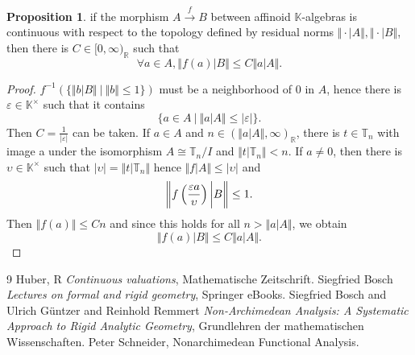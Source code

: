 \documentclass[10pt]{article}
\numberwithin{equation}{section}
\theoremstyle{definition}
\newtheorem{proposition}{Proposition}[subsection]
\newcommand{\norm}[1]{\Vert #1 \Vert}
\newcommand{\R}[0]{\mathbb{R}}
\newcommand{\T}[0]{\mathbb{T}}
\newcommand{\K}[0]{\mathbb{K}}
\newcommand{\sep}[0]{\:|\:}
\newcommand{\ab}[1]{\vert #1 \vert}
\begin{document}
\begin{proposition}
    \label{fact_31_11}
    if the morphism $A\stackrel{f}{\to}B$ between affinoid $\K$-algebras is continuous with respect to the topology defined by residual norms $\norm{\cdot|A},\norm{\cdot|B}$, then there is $C\in[0,\infty)_\R$ such that 
    \begin{equation*}
        \forall a\in A,\norm{f(a)|B}\leq C\norm{a|A}.
    \end{equation*}
\end{proposition}

\begin{proof}
    $f^{-1}(\{\norm{b|B}\sep \norm{b}\leq 1\})$ must be a neighborhood of $0$ in $A$, hence there is $\varepsilon\in\K^\times$ such that it contains 
    \begin{equation*}
        \{a\in A\sep \norm{a|A}\leq \ab{\varepsilon}\}.
    \end{equation*}
    Then $C={\frac 1 {\ab{\varepsilon}}}$ can be taken. If $a\in A$ and $n\in(\norm{a|A},\infty)_\R$, there is $t\in\T_n$ with image a under the isomorphism $A\cong\T_n/I$ and $\norm{t|\T_n}<n$. If $a\not=0$, then there is $\upsilon\in\K^\times$ such that $\ab{\upsilon}=\norm{t|\T_n}$ hence $\norm{f|A}\leq \ab{\upsilon}$ and 
    \begin{equation*}
        \left\Vert f\left({\frac {\varepsilon a} {\upsilon}}\right)\bigg{\vert}B\right\Vert \leq 1.
    \end{equation*}
    Then $\norm{f(a)}\leq Cn$ and since this holds for all $n>\norm{a|A}$, we obtain 
    \begin{equation*}
        \norm{f(a)|B}\leq C\norm{a|A}.
    \end{equation*}
\end{proof}

\begin{thebibliography}{9}
Huber, R \emph{Continuous valuations}, Mathematische Zeitschrift.
Siegfried Bosch \emph{Lectures on formal and rigid geometry}, Springer eBooks.
 Siegfried Bosch and Ulrich Güntzer and Reinhold Remmert \emph{Non-Archimedean Analysis: A Systematic Approach to Rigid Analytic Geometry}, Grundlehren der mathematischen Wissenschaften.
 Peter Schneider, Nonarchimedean Functional Analysis.
\end{thebibliography}
\end{document}
